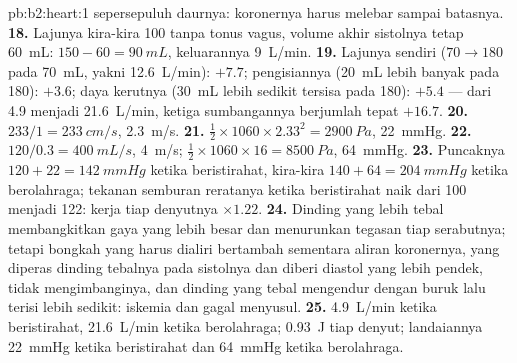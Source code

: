 \begin{solution}{pb:b2:heart:1}
sepersepuluh daurnya:  koronernya harus melebar sampai batasnya.
\textbf{18.} Lajunya kira-kira 100 tanpa tonus vagus, volume akhir
sistolnya tetap \qty{60}{mL}:  $150 - 60 = \qty{90}{mL}$,
keluarannya \qty{9}{L/min}.
\textbf{19.} Lajunya sendiri ($70 \to 180$ pada \qty{70}{mL}, yakni
\qty{12.6}{L/min}): $+7.7$; pengisiannya (\qty{20}{mL} lebih banyak pada 180):
$+3.6$; daya kerutnya (\qty{30}{mL} lebih sedikit tersisa pada 180): $+5.4$ ---
dari 4.9 menjadi \qty{21.6}{L/min}, ketiga sumbangannya berjumlah
tepat $+16.7$.
\textbf{20.} $233/1 = \qty{233}{cm/s}$, \qty{2.3}{m/s}.
\textbf{21.} $\tfrac12\times 1060\times 2.33^{2} = \qty{2900}{Pa}$,
\qty{22}{mmHg}.
\textbf{22.} $120/0.3 = \qty{400}{mL/s}$, \qty{4}{m/s}; $\tfrac12\times
1060\times 16 = \qty{8500}{Pa}$, \qty{64}{mmHg}.
\textbf{23.} Puncaknya $120 + 22 = \qty{142}{mmHg}$ ketika
beristirahat, kira-kira $140 +
64 = \qty{204}{mmHg}$ ketika
berolahraga; tekanan semburan reratanya ketika beristirahat naik dari
100 menjadi 122: kerja tiap denyutnya $\times 1.22$.
\textbf{24.} Dinding yang lebih tebal membangkitkan gaya yang lebih
besar dan menurunkan tegasan tiap serabutnya; tetapi bongkah yang harus
dialiri bertambah sementara aliran koronernya, yang diperas dinding
tebalnya pada sistolnya dan diberi diastol yang lebih pendek, tidak
mengimbanginya, dan dinding yang tebal mengendur dengan buruk lalu
terisi lebih sedikit: iskemia dan gagal  menyusul.
\textbf{25.} \qty{4.9}{L/min} ketika beristirahat, \qty{21.6}{L/min}
ketika berolahraga; \qty{0.93}{J} tiap denyut; landaiannya
\qty{22}{mmHg} ketika beristirahat dan \qty{64}{mmHg} ketika
berolahraga.
\end{solution}

